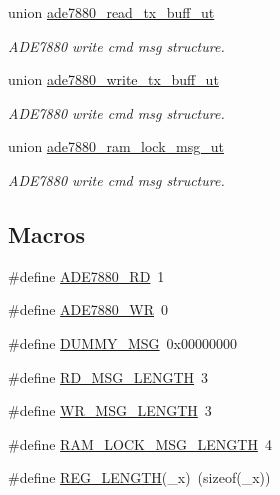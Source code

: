 \begin{DoxyCompactItemize}
union \hyperlink{a00016}{ade7880\-\_\-read\-\_\-tx\-\_\-buff\-\_\-ut}
\begin{DoxyCompactList}\small\item\em A\-D\-E7880 write cmd msg structure. \end{DoxyCompactList}\item 
union \hyperlink{a00020}{ade7880\-\_\-write\-\_\-tx\-\_\-buff\-\_\-ut}
\begin{DoxyCompactList}\small\item\em A\-D\-E7880 write cmd msg structure. \end{DoxyCompactList}\item 
union \hyperlink{a00012}{ade7880\-\_\-ram\-\_\-lock\-\_\-msg\-\_\-ut}
\begin{DoxyCompactList}\small\item\em A\-D\-E7880 write cmd msg structure. \end{DoxyCompactList}\end{DoxyCompactItemize}
\subsection*{Macros}
\begin{DoxyCompactItemize}
\item 
\#define \hyperlink{a00041_a30e8f63608e6153585d75dc479a03177}{A\-D\-E7880\-\_\-\-R\-D}~1
\item 
\#define \hyperlink{a00041_a36352e0d88dc7c5ede031013c75a678f}{A\-D\-E7880\-\_\-\-W\-R}~0
\item 
\#define \hyperlink{a00041_af87bc226c5bc1e648d8ceac69ccf2bcb}{D\-U\-M\-M\-Y\-\_\-\-M\-S\-G}~0x00000000
\item 
\#define \hyperlink{a00041_a0f0795755fb9e8e47c78c1289e091282}{R\-D\-\_\-\-M\-S\-G\-\_\-\-L\-E\-N\-G\-T\-H}~3
\item 
\#define \hyperlink{a00041_ac85ecf34a5cbd85d6dbd51b4c9a5469e}{W\-R\-\_\-\-M\-S\-G\-\_\-\-L\-E\-N\-G\-T\-H}~3
\item 
\#define \hyperlink{a00041_ab38a2f23d72262bab020eb973958f37b}{R\-A\-M\-\_\-\-L\-O\-C\-K\-\_\-\-M\-S\-G\-\_\-\-L\-E\-N\-G\-T\-H}~4
\item 
\#define \hyperlink{a00041_a4dc3b9b3e720309f9ebbb2d93768ed4f}{R\-E\-G\-\_\-\-L\-E\-N\-G\-T\-H}(\-\_\-x)~(sizeof(\-\_\-x))
\end{DoxyCompactItemize}
